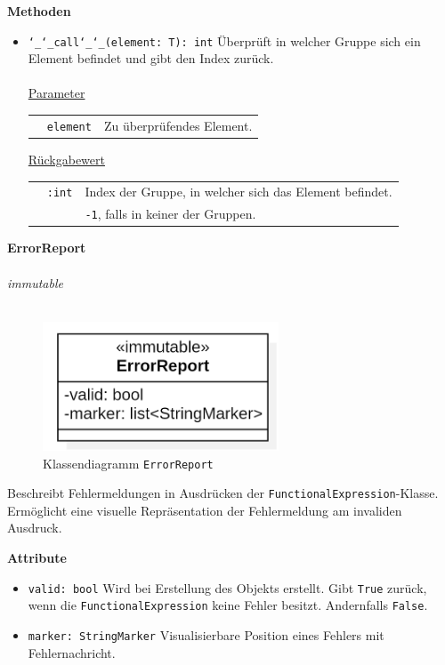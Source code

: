 \documentclass{article}
\begin{document}
\textbf{Methoden}
\begin{itemize}
\item \texttt{\char`_\char`_call\char`_\char`_(element: T): int} \newline Überprüft in welcher Gruppe sich ein Element befindet und gibt den Index zurück.
\\\\
\underline{{Parameter}}

\begin{tabular}{lll}
 & \texttt{element} & Zu überprüfendes Element. \\
\end{tabular}

\underline{Rückgabewert}

\begin{tabular}{lll}
 & \texttt{:int} & Index der Gruppe, in welcher sich das Element befindet. \\
 && \texttt{-1}, falls in keiner der Gruppen.\\
\end{tabular}
\end{itemize}


\newpage
\textbf{\large{ErrorReport}}\\\\
\textit{\flqq{}immutable\frqq}\normalsize\\\\
\begin{figure}[H]%
    \centering
    \includegraphics[width=7cm]{entwurf/Entwurf_dokument/img/cls/model/ErrorReport.png}
    \caption{Klassendiagramm \texttt{ErrorReport}}
\end{figure}

Beschreibt Fehlermeldungen in Ausdrücken der \texttt{FunctionalExpression}-Klasse. \\ Ermöglicht eine visuelle Repräsentation der Fehlermeldung am invaliden Ausdruck.
\newline \newline

\textbf{Attribute}
\begin{itemize}
\item \texttt{valid: bool} \newline Wird bei Erstellung des Objekts erstellt. Gibt \texttt{True} zurück, wenn die \texttt{FunctionalExpression} keine Fehler besitzt. Andernfalls \texttt{False}.
\item \texttt{marker: StringMarker} \newline Visualisierbare Position eines Fehlers mit Fehlernachricht.
\\\\
\end{itemize}
\end{document}
